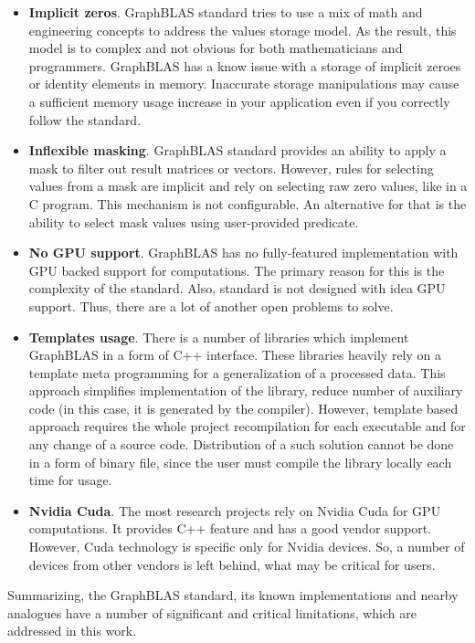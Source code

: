 \begin{itemize}
\item \textbf{Implicit zeros}. GraphBLAS standard tries to use a mix of math and engineering concepts to address the values storage model. As the result, this model is to complex and not obvious for both mathematicians and programmers. GraphBLAS has a know issue with a storage of implicit zeroes or identity elements in memory. Inaccurate storage manipulations may cause a sufficient memory usage increase in your application even if you correctly follow the standard.

\item \textbf{Inflexible masking}. GraphBLAS standard provides an ability to apply a mask to filter out result matrices or vectors. However, rules for selecting values from a mask are implicit and rely on selecting raw zero values, like in a C program. This mechanism is not configurable. An alternative for that is the ability to select mask values using user-provided predicate.

\item \textbf{No GPU support}. GraphBLAS has no fully-featured implementation with GPU backed support for computations. The primary reason for this is the complexity of the standard. Also, standard is not designed with idea GPU support. Thus, there are a lot of another open problems to solve.

\item \textbf{Templates usage}. There is a number of libraries which implement GraphBLAS in a form of C++ interface. These libraries heavily rely on a template meta programming for a generalization of a processed data. This approach simplifies implementation of the library, reduce number of auxiliary code (in this case, it is generated by the compiler). However, template based approach requires the whole project recompilation for each executable and for any change of a source code. Distribution of a such solution cannot be done in a form of binary file, since the user must compile the library locally each time for usage.

\item \textbf{Nvidia Cuda}. The most research projects rely on Nvidia Cuda for GPU computations. It provides C++ feature and has a good vendor support. However, Cuda technology is specific only for Nvidia devices. So, a number of devices from other vendors is left behind, what may be critical for users.

\end{itemize}

Summarizing, the GraphBLAS standard, its known implementations and nearby analogues have a number of significant and critical limitations, which are addressed in this work. 

